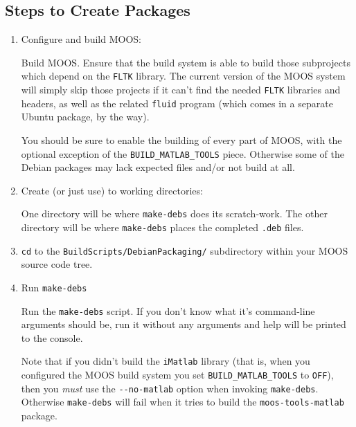 \documentclass[letterpaper,10pt]{article}
\begin{document}
\subsection{Steps to Create Packages}
\begin{enumerate}
 \item Configure and build MOOS:

	Build MOOS.  Ensure that the build system is able to build those 
	subprojects which depend on the \verb|FLTK| library.  The current
	version of the MOOS system will simply skip those projects if it
	can't find the needed \verb|FLTK| libraries and headers, as well as the
	related \verb|fluid| program (which comes in a separate Ubuntu package,
	by the way).

	You should be sure to enable the building of every part of MOOS, with
	the optional exception of the \verb|BUILD_MATLAB_TOOLS| piece.  Otherwise
	some of the Debian packages may lack expected files and/or not build
	at all.
 \item Create (or just use) to working directories:

	One directory will be where \verb|make-debs| does its scratch-work.  The
	other directory will be where \verb|make-debs| places the completed
	\verb|.deb| files.

 \item \verb|cd| to the \verb|BuildScripts/DebianPackaging/| subdirectory within
	your MOOS source code tree.
 \item Run \verb|make-debs|

	Run the \verb|make-debs| script.  If you don't know what it's command-line
	arguments should be, run it without any arguments and help will be printed
	to the console.

	Note that if you didn't build the \verb|iMatlab| library (that is, when
	you configured the MOOS build system you set \verb|BUILD_MATLAB_TOOLS| 
	to \verb|OFF|), then you \textit{must} use the \verb|--no-matlab| option
	when invoking \verb|make-debs|.  Otherwise \verb|make-debs| will fail
	when it tries to build the \verb|moos-tools-matlab| package.
\end{enumerate}
\end{document}
